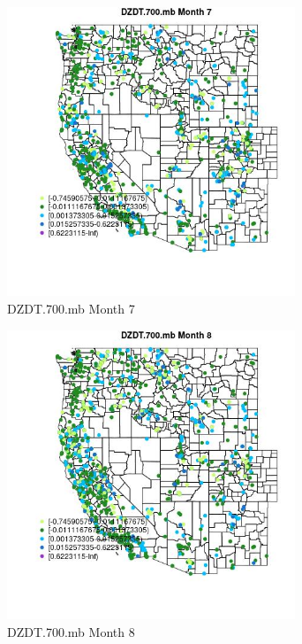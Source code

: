 \begin{figure} 
\centering  
\includegraphics[width=0.77\textwidth]{Code_Outputs/Report_ML_input_PM25_Step4_part_f_de_duplicated_aveswNAs_MapObsMo7DZDT700mb.jpg} 
\caption{\label{fig:Report_ML_input_PM25_Step4_part_f_de_duplicated_aveswNAsMapObsMo7DZDT700mb}DZDT.700.mb Month 7} 
\end{figure} 
 

\begin{figure} 
\centering  
\includegraphics[width=0.77\textwidth]{Code_Outputs/Report_ML_input_PM25_Step4_part_f_de_duplicated_aveswNAs_MapObsMo8DZDT700mb.jpg} 
\caption{\label{fig:Report_ML_input_PM25_Step4_part_f_de_duplicated_aveswNAsMapObsMo8DZDT700mb}DZDT.700.mb Month 8} 
\end{figure} 
 

